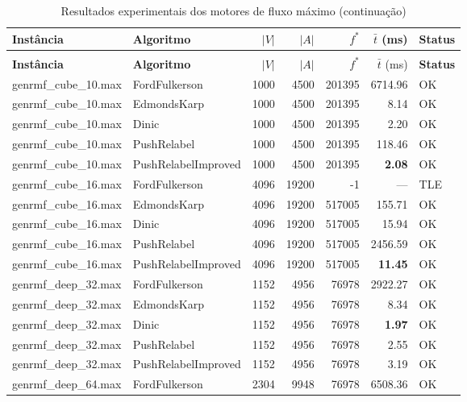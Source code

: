 \begingroup
\small
\setlength{\tabcolsep}{4pt}
\begin{longtable}{llrrrrl}
\caption{Resultados experimentais dos motores de fluxo máximo.}\label{tab:results_maxflow}\\
\toprule
\textbf{Instância} & \textbf{Algoritmo} & $|V|$ & $|A|$ & $f^*$ & $\bar{t}$ (ms) & \textbf{Status} \\
\midrule
\endfirsthead
\caption[]{Resultados experimentais dos motores de fluxo máximo (continuação)}\\
\toprule
\textbf{Instância} & \textbf{Algoritmo} & $|V|$ & $|A|$ & $f^*$ & $\bar{t}$ (ms) & \textbf{Status} \\
\midrule
\endhead
\bottomrule
\endfoot
genrmf\_cube\_10.max & FordFulkerson & 1000 & 4500 & 201395 & 6714.96 & OK \\
genrmf\_cube\_10.max & EdmondsKarp & 1000 & 4500 & 201395 & 8.14 & OK \\
genrmf\_cube\_10.max & Dinic & 1000 & 4500 & 201395 & 2.20 & OK \\
genrmf\_cube\_10.max & PushRelabel & 1000 & 4500 & 201395 & 118.46 & OK \\
genrmf\_cube\_10.max & PushRelabelImproved & 1000 & 4500 & 201395 & \textbf{2.08} & OK \\
\midrule
genrmf\_cube\_16.max & FordFulkerson & 4096 & 19200 & -1 & --- & TLE \\
genrmf\_cube\_16.max & EdmondsKarp & 4096 & 19200 & 517005 & 155.71 & OK \\
genrmf\_cube\_16.max & Dinic & 4096 & 19200 & 517005 & 15.94 & OK \\
genrmf\_cube\_16.max & PushRelabel & 4096 & 19200 & 517005 & 2456.59 & OK \\
genrmf\_cube\_16.max & PushRelabelImproved & 4096 & 19200 & 517005 & \textbf{11.45} & OK \\
\midrule
genrmf\_deep\_32.max & FordFulkerson & 1152 & 4956 & 76978 & 2922.27 & OK \\
genrmf\_deep\_32.max & EdmondsKarp & 1152 & 4956 & 76978 & 8.34 & OK \\
genrmf\_deep\_32.max & Dinic & 1152 & 4956 & 76978 & \textbf{1.97} & OK \\
genrmf\_deep\_32.max & PushRelabel & 1152 & 4956 & 76978 & 2.55 & OK \\
genrmf\_deep\_32.max & PushRelabelImproved & 1152 & 4956 & 76978 & 3.19 & OK \\
\midrule
genrmf\_deep\_64.max & FordFulkerson & 2304 & 9948 & 76978 & 6508.36 & OK \\

\end{longtable}
